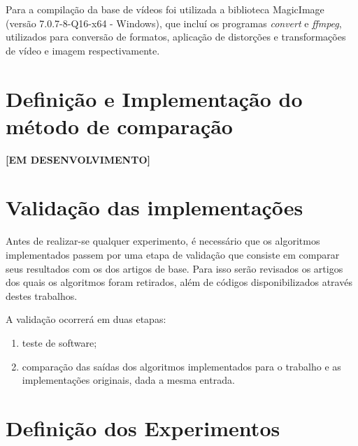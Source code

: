 Para a compilação da base de vídeos foi utilizada a biblioteca MagicImage (versão 7.0.7-8-Q16-x64 - Windows), que incluí os programas \textit{convert} e \textit{ffmpeg}, utilizados para conversão de formatos, aplicação de distorções e transformações de vídeo e imagem respectivamente.

\section{Definição e Implementação do método de comparação}


\textbf{[EM DESENVOLVIMENTO]}





\section{Validação das implementações}

Antes de realizar-se qualquer experimento, é necessário que os algoritmos implementados passem por uma etapa de validação que consiste em comparar seus resultados com os dos artigos de base. Para isso serão revisados os artigos dos quais os algoritmos foram retirados, além de códigos disponibilizados através destes trabalhos.

A validação ocorrerá em duas etapas:

\begin{enumerate}
\item teste de software;
\item comparação das saídas dos algoritmos implementados para o trabalho e as implementações originais, dada a mesma entrada.
\end{enumerate}

\section{Definição dos Experimentos}
\label{sec:definicaoexperimentos}